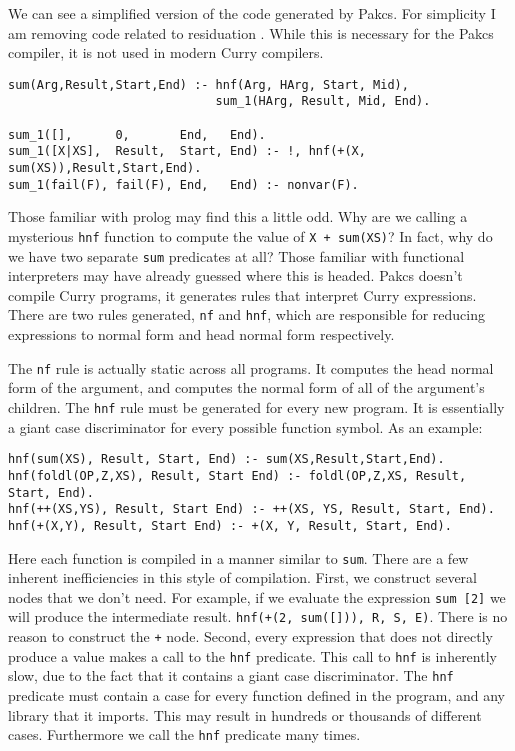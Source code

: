 We can see a simplified version of the code generated by Pakcs.
For simplicity I am removing code related to residuation \cite{Pakcs}.
While this is necessary for the Pakcs compiler, it is not used in modern Curry compilers.

\begin{verbatim}
sum(Arg,Result,Start,End) :- hnf(Arg, HArg, Start, Mid),
                             sum_1(HArg, Result, Mid, End).

sum_1([],      0,       End,   End).
sum_1([X|XS],  Result,  Start, End) :- !, hnf(+(X, sum(XS)),Result,Start,End).
sum_1(fail(F), fail(F), End,   End) :- nonvar(F).
\end{verbatim}

Those familiar with prolog may find this a little odd.
Why are we calling a mysterious \texttt{hnf} function to compute the value of \texttt{X + sum(XS)}?
In fact, why do we have two separate \texttt{sum} predicates at all?
Those familiar with functional interpreters may have already guessed where this is headed.
Pakcs doesn't compile Curry programs, it generates rules that interpret Curry expressions.
There are two rules generated, \texttt{nf} and \texttt{hnf}, which are responsible for reducing expressions
to normal form and head normal form respectively.

The \texttt{nf} rule is actually static across all programs.  It computes the head normal form of the argument,
and computes the normal form of all of the argument's children.
The \texttt{hnf} rule must be generated for every new program.
It is essentially a giant case discriminator for every possible function symbol.
As an example:

\begin{verbatim}
hnf(sum(XS), Result, Start, End) :- sum(XS,Result,Start,End).
hnf(foldl(OP,Z,XS), Result, Start End) :- foldl(OP,Z,XS, Result, Start, End).
hnf(++(XS,YS), Result, Start End) :- ++(XS, YS, Result, Start, End).
hnf(+(X,Y), Result, Start End) :- +(X, Y, Result, Start, End).
\end{verbatim}

Here each function is compiled in a manner similar to \texttt{sum}.
There are a few inherent inefficiencies in this style of compilation.
First, we construct several nodes that we don't need.
For example, if we evaluate the expression \texttt{sum [2]} we will produce the intermediate result.
\texttt{hnf(+(2, sum([])), R, S, E)}.
There is no reason to construct the \texttt + node.
Second, every expression that does not directly produce a value makes a call to the \texttt{hnf}
predicate.
This call to \texttt{hnf} is inherently slow, due to the fact that it contains a giant case discriminator.
The \texttt{hnf} predicate must contain a case for every function defined in the program, and any library that it imports.
This may result in hundreds or thousands of different cases.  Furthermore we call the \texttt{hnf} predicate many times.

